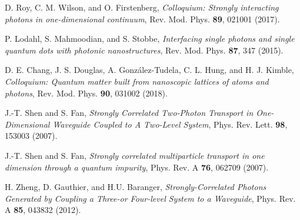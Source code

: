 \documentclass[pra,twocolumn,showpacs,preprintnumbers,amsmath,amssymb]{revtex4-1}
\begin{document}
\begin{thebibliography}{99}






 D. Roy, C. M. Wilson, and O. Firstenberg, \textit{Colloquium: Strongly interacting photons in one-dimensional continuum}, Rev. Mod. Phys. {\bf 89},  021001 (2017).



 P. Lodahl, S. Mahmoodian, and S. Stobbe, \textit{Interfacing single photons and single quantum dots with photonic nanostructures}, Rev. Mod. Phys. {\bf 87}, 347 (2015).







 D. E. Chang, J. S. Douglas, A. Gonz\'alez-Tudela, C. L. Hung, and H. J. Kimble, \textit{Colloquium: Quantum matter built from nanoscopic lattices of atoms and photons}, Rev. Mod. Phys.  {\bf 90}, 031002 (2018).



 J.-T. Shen and S. Fan,  \textit{Strongly Correlated Two-Photon Transport in One-Dimensional Waveguide Coupled to A Two-Level System},   
Phys. Rev. Lett.  {\bf 98}, 153003  (2007).  

 J.-T. Shen and S. Fan,  \textit{Strongly correlated multiparticle
transport in one dimension through a quantum impurity},   
Phys. Rev. A  {\bf 76}, 062709 (2007).  



 H. Zheng, D. Gauthier, and H.U. Baranger, \textit{Strongly-Correlated Photons Generated by Coupling a Three-or Four-level System to a Waveguide}, Phys. Rev. A {\bf 85}, 043832 (2012).






\end{thebibliography}
\end{document}
